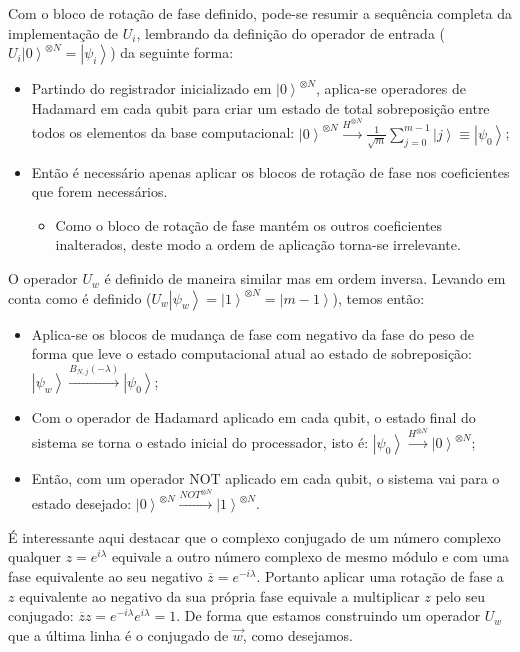 Com o bloco de rotação de fase definido, pode-se resumir a sequência completa da implementação de $U_{i}$, lembrando da definição do operador de entrada ($U_{i}\left|0\right\rangle ^{\otimes N}=\left|\psi_{i}\right\rangle $) da seguinte forma:
\begin{itemize}
\item Partindo  do registrador inicializado em $\left|0\right\rangle ^{\otimes N}$, aplica-se operadores de Hadamard em cada qubit para criar um estado de total sobreposição entre todos os elementos da base computacional: $\left|0\right\rangle ^{\otimes N}\stackrel{H^{\otimes N}}{\rightarrow}\frac{1}{\sqrt{m}}\sum_{j=0}^{m-1}\left|j\right\rangle \equiv\left|\psi_{0}\right\rangle  $;
\end{itemize}
\begin{itemize}
\item Então é necessário apenas aplicar os blocos de rotação de fase nos coeficientes que forem necessários.
\begin{itemize}
\item Como o bloco de rotação de fase mantém os outros coeficientes inalterados, deste modo a ordem de aplicação torna-se irrelevante.
\end{itemize}
\end{itemize}

O operador $U_{w}$ é definido de maneira similar mas em ordem inversa. Levando em conta como é definido ($U_{w}\left|\psi_{w}\right\rangle =\left|1\right\rangle ^{\otimes N}=\left|m-1\right\rangle$), temos então:
\begin{itemize}
\item Aplica-se os blocos de mudança de fase com negativo da fase do peso de forma que leve o estado computacional atual ao estado de sobreposição:  $\left|\psi_{w}\right\rangle \stackrel{B_{N,j}\left(- \lambda\right)}{\rightarrow}\left|\psi_{0}\right\rangle $;
\item Com o operador de Hadamard  aplicado em cada qubit, o estado final do sistema se torna o estado inicial do processador, isto é: $\left|\psi_{0}\right\rangle \stackrel{H^{\otimes N}}{\rightarrow}\left|0\right\rangle ^{\otimes N}$;
\item Então, com um operador NOT aplicado em cada qubit, o sistema vai para o estado desejado: $\left|0\right\rangle ^{\otimes N}\stackrel{NOT^{\otimes N}}{\rightarrow}\left|1\right\rangle ^{\otimes N}$.
\end{itemize}

É interessante aqui destacar que o complexo conjugado de um número complexo qualquer   $z=e^{i\lambda}$  equivale a outro número complexo de mesmo módulo e com uma fase equivalente ao seu negativo $\overline{z}=e^{-i\lambda}$. Portanto aplicar uma rotação de fase a $z$ equivalente ao negativo da sua própria fase equivale a multiplicar $z$ pelo seu conjugado: $\overline{z}z=e^{-i\lambda}e^{i\lambda}=1$. De forma que estamos construindo um operador $U_{w}$ que a última linha é o conjugado de $\overrightarrow{w}$, como desejamos.

